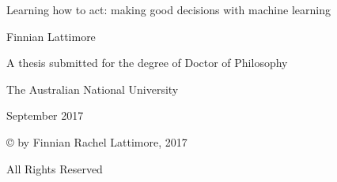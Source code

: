 \begin{titlepage}
    \begin{center}
        \vspace*{1cm}
        
        \Huge
        {Learning how to act: making good decisions with machine learning}
        
        \vspace{2cm}
        \Large
        {Finnian Lattimore}
        
        \vfill
        \Large
        A thesis submitted for the degree of Doctor of Philosophy
         
         The Australian National University
        
        September 2017
        \vspace{2cm}
    
    \normalsize
    \copyright \hspace{.01mm} by Finnian Rachel Lattimore, 2017
    
    All Rights Reserved
    \end{center}
\end{titlepage}